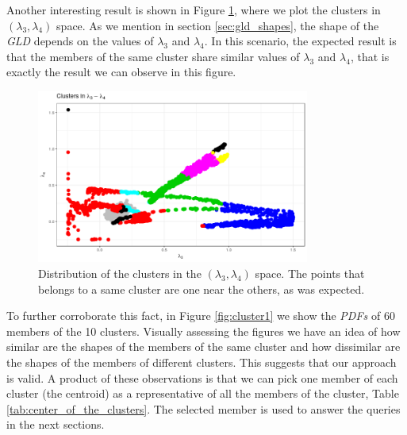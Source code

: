 Another interesting result is shown in Figure \ref{fig:clusters_lambda3_lambda4_space}, where we plot the clusters in $(\lambda_{3}, \lambda_{4})$ space. As we mention in section \ref{sec:gld_shapes}, the shape of the \textit{GLD} depends on the values of $\lambda_{3}$ and $\lambda_{4}$. In this scenario, the expected result is that the members of the same cluster share similar values of $\lambda_{3}$ and $\lambda_{4}$, that is exactly the result we can observe in this figure. 

\begin{figure}[H]
    \centering
    \includegraphics[width=0.8\textwidth]{img/use_cases/case_study_I/Clusters_lambda3_lambda4_v3.png}
    \caption{Distribution of the clusters in the $(\lambda_{3}, \lambda_{4})$ space. The points that belongs to a same cluster are one near the others, as was expected.}
    \label{fig:clusters_lambda3_lambda4_space}
\end{figure}

To further corroborate this fact, in Figure \ref{fig:cluster1} we show the \textit{PDFs} of 60 members of the 10 clusters. Visually assessing the figures we have an idea of how similar are the shapes of the members of the same cluster and how dissimilar are the shapes of the  members of different clusters. This suggests that our approach is valid. A product of these observations is that we can pick one member of each cluster (the centroid) as a representative of all the members of the cluster, Table \ref{tab:center_of_the_clusters}. The selected member is used to answer the queries in the next sections.

